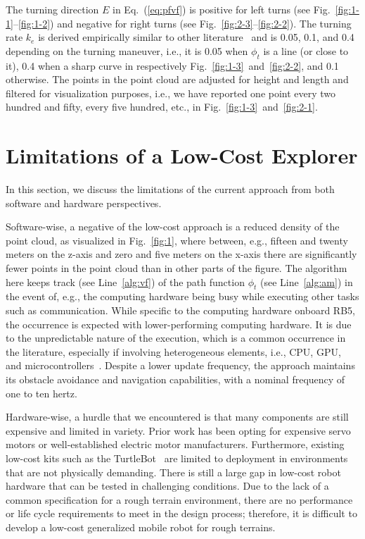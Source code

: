 \documentclass[letterpaper,10pt,conference,twoside]{IEEEtran}
\theoremstyle{definition}
\begin{document}
The turning direction $E$ in Eq.~(\ref{eq:pfvf}) is positive for left turns (see Fig.~\ref{fig:1-1}--\ref{fig:1-2}) and negative for right turns (see Fig.~\ref{fig:2-3}--\ref{fig:2-2}). The turning rate $k_e$ is derived empirically similar to other literature~\cite{seewald2022energy,garcia2017guidance} and is 0.05, 0.1, and 0.4 depending on the turning maneuver, i.e., it is 0.05 when $\phi_t$ is a line (or close to it), 0.4 when a sharp curve in respectively Fig.~\ref{fig:1-3}~and~\ref{fig:2-2}, and 0.1 otherwise.  
The points in the point cloud are adjusted for height and length and filtered for visualization purposes, i.e., we have reported one point every two hundred and fifty, every five hundred, etc., in Fig.~\ref{fig:1-3}~and~\ref{fig:2-1}.

\section{Limitations of a Low-Cost Explorer}\label{sec:lim}
\noindent
In this section, we discuss 
the limitations of the current approach from both software and hardware perspectives.

Software-wise, a negative of the low-cost approach is a reduced density of the point cloud, as visualized in Fig.~\ref{fig:1}, where between, e.g., fifteen and twenty meters on the z-axis and zero and five meters on the x-axis there are significantly fewer points in the point cloud than in other parts of the figure. 
The algorithm here keeps track (see Line~\ref{alg:vf}) of the path function $\phi_t$ (see Line~\ref{alg:am}) in the event of, e.g., the computing hardware being busy while executing other tasks such as communication. While specific to the computing hardware onboard RB5, the occurrence is expected with lower-performing computing hardware. It is due to the unpredictable nature of the execution, which is a common occurrence in the literature, especially if involving heterogeneous elements, i.e., CPU, GPU, and microcontrollers~\cite{seewald2019coarse}.
Despite a lower update frequency, the approach maintains its obstacle avoidance and navigation capabilities, with a nominal frequency of one to ten hertz.

Hardware-wise, a hurdle that we encountered %
is that many components are still %
expensive and limited in variety. Prior work has been %
opting for expensive servo motors or well-established electric motor manufacturers.
%
Furthermore, existing low-cost %
kits such as the TurtleBot~\cite{amster2020turtlebot} are limited to deployment in %
environments that are not physically demanding. There is still a large gap in low-cost robot hardware that can be tested in challenging conditions. Due to the lack of a common specification %
for a rough terrain environment, there are no performance or life cycle requirements to meet in the %
design process; therefore, it is difficult to develop a low-cost generalized mobile robot for rough terrains.
\end{document}
